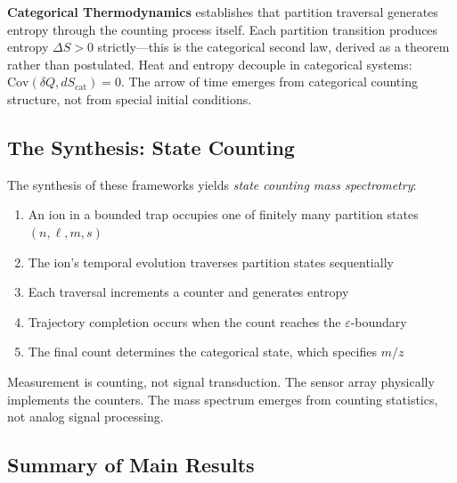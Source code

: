 \documentclass[twocolumn,10pt]{article}
\newcommand{\eps}{\varepsilon}
\begin{document}
\textbf{Categorical Thermodynamics} \cite{categoricalthermo2026} establishes that partition traversal generates entropy through the counting process itself. Each partition transition produces entropy $\Delta S > 0$ strictly---this is the categorical second law, derived as a theorem rather than postulated. Heat and entropy decouple in categorical systems: $\text{Cov}(\delta Q, dS_{\text{cat}}) = 0$. The arrow of time emerges from categorical counting structure, not from special initial conditions.

\subsection{The Synthesis: State Counting}

The synthesis of these frameworks yields \emph{state counting mass spectrometry}:

\begin{enumerate}
    \item An ion in a bounded trap occupies one of finitely many partition states $(n, \ell, m, s)$
    \item The ion's temporal evolution traverses partition states sequentially
    \item Each traversal increments a counter and generates entropy
    \item Trajectory completion occurs when the count reaches the $\eps$-boundary
    \item The final count determines the categorical state, which specifies $m/z$
\end{enumerate}

Measurement is counting, not signal transduction. The sensor array physically implements the counters. The mass spectrum emerges from counting statistics, not analog signal processing.

\subsection{Summary of Main Results}
\end{document}
